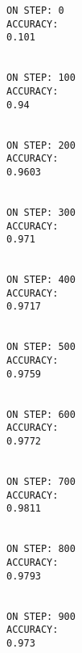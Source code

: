 \documentclass[11pt]{article}
\begin{document}
    \begin{Verbatim}[commandchars=\\\{\}]
ON STEP: 0
ACCURACY: 
0.101


ON STEP: 100
ACCURACY: 
0.94


ON STEP: 200
ACCURACY: 
0.9603


ON STEP: 300
ACCURACY: 
0.971


ON STEP: 400
ACCURACY: 
0.9717


ON STEP: 500
ACCURACY: 
0.9759


ON STEP: 600
ACCURACY: 
0.9772


ON STEP: 700
ACCURACY: 
0.9811


ON STEP: 800
ACCURACY: 
0.9793


ON STEP: 900
ACCURACY: 
0.973



    \end{Verbatim}


    
    
    
    
\end{document}
